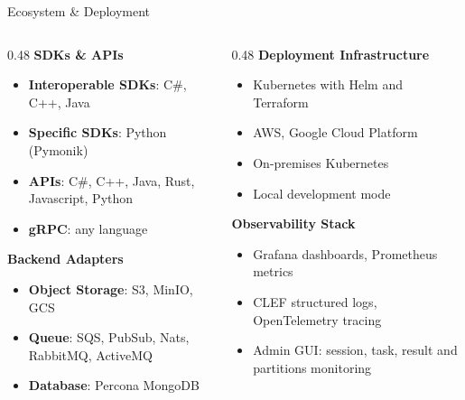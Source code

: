 \begin{frame}{Ecosystem \& Deployment}
	\begin{columns}[T]
		\begin{column}{0.48\textwidth}
			{\small\bfseries\color{aneoblue}SDKs \& APIs}\\[3pt]
			\begin{itemize}
				\item \textbf{Interoperable SDKs}: C\#, C++, Java
				\item \textbf{Specific SDKs}: Python (Pymonik)
				\item \textbf{APIs}: C\#, C++, Java, Rust, Javascript, Python
				\item \textbf{gRPC}: any language
			\end{itemize}
			{\small\bfseries\color{aneoblue}Backend Adapters}\\[3pt]
			\begin{itemize}
				\item \textbf{Object Storage}: S3, MinIO, GCS
				\item \textbf{Queue}: SQS, PubSub, Nats, RabbitMQ, ActiveMQ
				\item \textbf{Database}: Percona MongoDB
			\end{itemize}
		\end{column}
		\begin{column}{0.48\textwidth}
			{\small\bfseries\color{aneoblue}Deployment Infrastructure}\\[3pt]
			\begin{itemize}
				\item Kubernetes with Helm and Terraform
				\item AWS, Google Cloud Platform
				\item On-premises Kubernetes
				\item Local development mode
			\end{itemize}
			{\small\bfseries\color{aneoblue}Observability Stack}\\[3pt]
			\begin{itemize}
				\item Grafana dashboards, Prometheus metrics
				\item CLEF structured logs, OpenTelemetry tracing
				\item Admin GUI: session, task, result and partitions monitoring
			\end{itemize}
		\end{column}
	\end{columns}
\end{frame}

